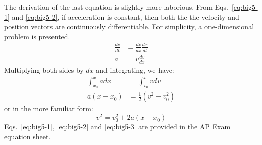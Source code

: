 \documentclass[11pt]{article}
\newcommand{\mb}[1]{\ensuremath\mathbf{#1}}
\begin{document}
The derivation of the last equation is slightly more laborious. From
Eqs.~\ref{eq:big5-1} and \ref{eq:big5-2}, if acceleration is constant, then
both the the velocity and position vectors are continuously differentiable. For
simplicity, a one-dimensional problem is presented.
\begin{align*}
  \frac{dv}{dt}&=\frac{dv}{dx}\frac{dx}{dt}\\
  a&=v\frac{dv}{dx}
\end{align*}
Multiplying both sides by $dx$ and integrating, we have:
\begin{align*}
  \int_{x_0}^x adx&=\int_{v_0}^v vdv\\
  a(x-x_0)&=\frac12\left(v^2-v_0^2\right)
\end{align*}
or in the more familiar form:
\begin{equation}
  \boxed{v^2 = v_0^2+ 2a(x-x_0)}
  \label{eq:big5-3}
\end{equation}
Eqs.~\ref{eq:big5-1}, \ref{eq:big5-2} and \ref{eq:big5-3} are provided in the
AP Exam equation sheet.
%  
%
\end{document}
